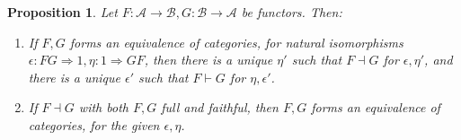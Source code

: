 \documentclass[a4paper,11pt]{article}
\theoremstyle{plain}
\newtheorem{proposition}{Proposition}[section]
\theoremstyle{remark}
\newcommand{\mc}[1]{\mathcal{#1}}
\begin{document}
\begin{proposition}\label{prop:adjunctions_and_equivs}
Let $F\colon\mc A\to\mc B, G \colon \mc B \to \mc A$ be functors.  Then:
\begin{enumerate}
\item\label{prop:adjunctions_and_equivs:one}
  If $F,G$ forms an equivalence of categories, for natural isomorphisms $\epsilon\colon FG \Rightarrow 1, \eta \colon 1 \Rightarrow GF$, then there is a unique $\eta'$ such that $F \dashv G$ for $\epsilon,\eta'$, and there is a unique $\epsilon'$ such that $F \vdash G$ for $\eta,\epsilon'$.
\item\label{prop:adjunctions_and_equivs:two}
  If $F \dashv G$ with both $F,G$ full and faithful, then $F,G$ forms an equivalence of categories, for the given $\epsilon,\eta$.
\end{enumerate}
\end{proposition}
\end{document}
